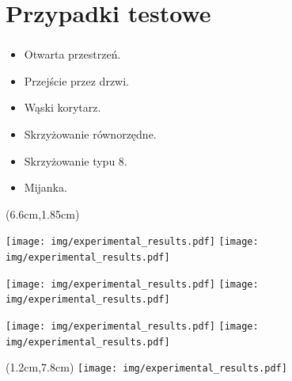 \documentclass{beamer}
\begin{document}
\section{Przypadki testowe}
\begin{frame}
\frametitle{\secname}

\begin{itemize}
	\item Otwarta przestrzeń.
	\item Przejście przez drzwi.	
	\item Wąski korytarz.
	\item Skrzyżowanie równorzędne.
	\item Skrzyżowanie typu 8.
	\item Mijanka.	
\end{itemize}

\begin{textblock*}{8cm}(6.6cm,1.85cm) %
	
	\texttt{[image: img/experimental\_results.pdf]}
	\texttt{[image: img/experimental\_results.pdf]}
	
	\texttt{[image: img/experimental\_results.pdf]}	
	\texttt{[image: img/experimental\_results.pdf]}
	
	\texttt{[image: img/experimental\_results.pdf]}
	\texttt{[image: img/experimental\_results.pdf]}
	
\end{textblock*}

\begin{textblock*}{5cm}(1.2cm,7.8cm) %
	\texttt{[image: img/experimental\_results.pdf]}	
\end{textblock*}


\end{frame}







\end{document}
